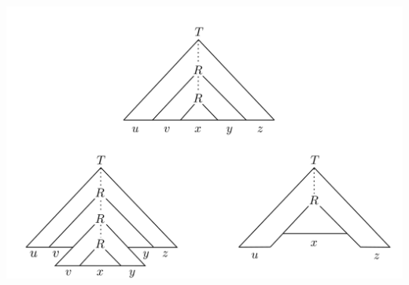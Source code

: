 \begin{frame}[allowframebreaks]
	\begin{center}
		\includegraphics[scale=0.2]{figur/figur235.png}
	\end{center}
\end{frame}

